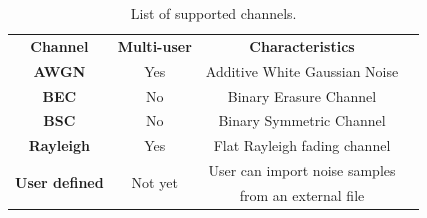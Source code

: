 \documentclass[11pt]{report}
\begin{document}
\begin{table}[htp]
  \centering
  \caption{List of supported channels.}
  \label{tab:channels}
  {\footnotesize%
    \begin{tabular}{| c | c | c | c |}
      \hline
      \multirow{2}{*}{\textbf{Channel}}      & \multirow{2}{*}{\textbf{Multi-user}} & \multirow{2}{*}{\textbf{Characteristics}}      \\
                                             &                                      &                                                \\
      \hline
      \multirow{2}{*}{\textbf{AWGN}}         & \multirow{2}{*}{Yes}                 & \multirow{2}{*}{Additive White Gaussian Noise} \\
                                             &                                      &                                                \\
      \hline
      \multirow{2}{*}{\textbf{BEC}}          & \multirow{2}{*}{No}                  & \multirow{2}{*}{Binary Erasure Channel}        \\
                                             &                                      &                                                \\
      \hline
      \multirow{2}{*}{\textbf{BSC}}          & \multirow{2}{*}{No}                  & \multirow{2}{*}{Binary Symmetric Channel}      \\
                                             &                                      &                                                \\
      \hline
      \multirow{2}{*}{\textbf{Rayleigh}}     & \multirow{2}{*}{Yes}                 & \multirow{2}{*}{Flat Rayleigh fading channel}  \\
                                             &                                      &                                                \\
      \hline
      \multirow{2}{*}{\textbf{User defined}} & \multirow{2}{*}{Not yet}             & User can import noise samples                  \\
                                             &                                      & from an external file                          \\
      \hline
    \end{tabular}
  }%
\end{table}
\end{document}
